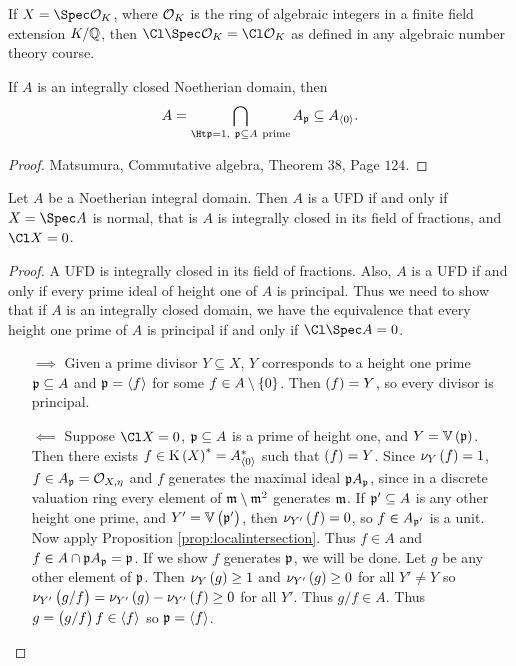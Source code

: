 \begin{remark*}
If $ X = \Spec \OOO_K $, where $ \mathcal{O}_K $ is the ring of algebraic integers in a finite field extension $ K / \mathbb{Q} $, then $ \Cl \Spec \OOO_K = \Cl \OOO_K $ as defined in any algebraic number theory course.
\end{remark*}

\begin{proposition}
\label{prop:localintersection}
If $ A $ is an integrally closed Noetherian domain, then
$$ A = \bigcap_{\Ht \ppp = 1, \ \ppp \subseteq A \ \text{prime}} A_\ppp \subseteq A_{\abr{0}}. $$
\end{proposition}

\begin{proof}
Matsumura, Commutative algebra, Theorem $ 38 $, Page $ 124 $.
\end{proof}

\pagebreak

\begin{theorem}
Let $ A $ be a Noetherian integral domain. Then $ A $ is a UFD if and only if $ X = \Spec A $ is normal, that is $ A $ is integrally closed in its field of fractions, and $ \Cl X = 0 $.
\end{theorem}

\begin{proof}
A UFD is integrally closed in its field of fractions. Also, $ A $ is a UFD if and only if every prime ideal of height one of $ A $ is principal. Thus we need to show that if $ A $ is an integrally closed domain, we have the equivalence that every height one prime of $ A $ is principal if and only if $ \Cl \Spec A = 0 $.
\begin{itemize}
\item[$ \implies $] Given a prime divisor $ Y \subseteq X $, $ Y $ corresponds to a height one prime $ \mathfrak{p} \subseteq A $ and $ \mathfrak{p} = \left\langle f \right\rangle $ for some $ f \in A \setminus \cbr{0} $. Then $ \br{f} = Y $, so every divisor is principal.
\item[$ \impliedby $] Suppose $ \Cl X = 0 $, $ \mathfrak{p} \subseteq A $ is a prime of height one, and $ Y = \VV\br{\ppp} $. Then there exists $ f \in \K\br{X}^* = A_{\abr{0}}^* $ such that $ \br{f} = Y $. Since $ \nu_Y\br{f} = 1 $, $ f \in A_{\mathfrak{p}} = \mathcal{O}_{X, \eta} $ and $ f $ generates the maximal ideal $ \mathfrak{p} A_{\mathfrak{p}} $, since in a discrete valuation ring every element of $ \mathfrak{m} \setminus \mathfrak{m}^2 $ generates $ \mathfrak{m} $. If $ \mathfrak{p}' \subseteq A $ is any other height one prime, and $ Y' = \VV\br{\ppp'} $, then $ \nu_{Y'}\br{f} = 0 $, so $ f \in A_{\mathfrak{p}'} $ is a unit. Now apply Proposition \ref{prop:localintersection}. Thus $ f \in A $ and $ f \in A \cap \mathfrak{p} A_{\mathfrak{p}} = \mathfrak{p} $. If we show $ f $ generates $ \mathfrak{p} $, we will be done. Let $ g $ be any other element of $ \mathfrak{p} $. Then $ \nu_Y\br{g} \ge 1 $ and $ \nu_{Y'}\br{g} \ge 0 $ for all $ Y' \ne Y $ so $ \nu_{Y'}\br{g / f} = \nu_{Y'}\br{g} - \nu_{Y'}\br{f} \ge 0 $ for all $ Y' $. Thus $ g / f \in A $. Thus $ g = \br{g / f}f \in \abr{f} $ so $ \mathfrak{p} = \left\langle f \right\rangle $.
\end{itemize}
\end{proof}

